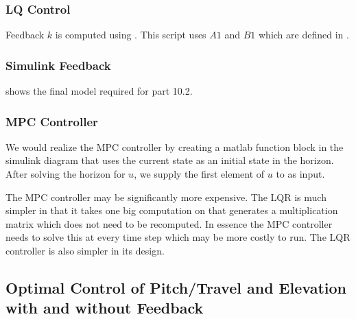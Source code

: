 \subsubsection{LQ Control}
Feedback $k$ is computed using .  This script uses $A1$ and $B1$ which are defined in .

\subsubsection{Simulink Feedback}

 shows the final model required for part 10.2.


\subsubsection{MPC Controller}
We would realize the MPC controller by creating a matlab function block in the simulink diagram that uses the current state as an initial state in the horizon. After solving the horizon for $u$, we supply the first element of $u$ to as input.

The MPC controller may be significantly more expensive. The LQR is much simpler in that it takes one big computation on that generates a multiplication matrix which does not need to be recomputed. In essence the MPC controller needs to solve this at every time step which may be more costly to run. The LQR controller is also simpler in its design.


\subsection{Optimal Control of Pitch/Travel and Elevation with and without Feedback}
